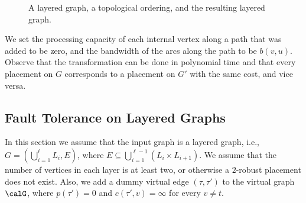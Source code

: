 \begin{figure}[t]
\begin{center}
\end{center}
\caption[\scp{} - Layered graph transformation]{A layered graph, a topological ordering, and the resulting
  layered graph.}
\label{fig:layer-transform}
\end{figure}

We set the processing capacity of each internal vertex along a path
that was added to be zero, and the bandwidth of the arcs along the
path to be $b(v,u)$.  Observe that the transformation can be done in
polynomial time and that every placement on $G$ corresponds to a
placement on $G'$ with the same cost, and vice versa.


\subsection{Fault Tolerance on Layered Graphs}

In this section we assume that the input graph is a layered graph,
i.e., $G = (\bigcup_{i = 1}^\ell L_i, E)$, where $E \subseteq
\bigcup_{i = 1}^{\ell - 1} (L_i \times L_{i+1})$.  We assume that the
number of vertices in each layer is at least two, or otherwise a
$2$-robust placement does not exist.
%
Also, we add a dummy virtual edge $(\tau,\tau')$ to the virtual graph
$\calG$, where $p(\tau')=0$ and $c(\tau',v) = \infty$ for every $v
\neq t$.

